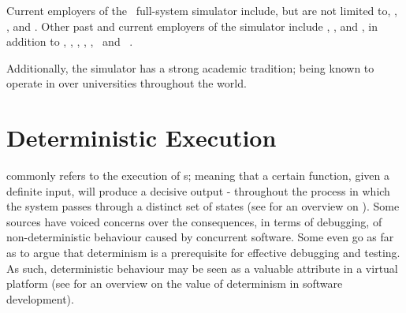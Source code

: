 Current employers of the \dvttermsimics\ full-system simulator include, but are not limited to, \dvttermibm {}, \dvttermnasa {}, and \dvttermintel {}.
Other past and current employers of the simulator include \dvttermsunmicrosystems , \dvttermericsson , and \dvttermhewlettpackard {}, in addition to \dvttermcisco , \dvttermfreescalesemiconductor , \dvttermgeavionics , \dvttermhoneywell , \dvttermlockheedmartin , \dvttermnortel\ and \dvttermnorthropgrumman\ .

Additionally, the simulator has a strong academic tradition; being known to operate in over  universities throughout the world.


\section*{Deterministic Execution}
\label{sec:background_deterministicexecution}

 commonly refers to the execution of \dvttermdeterministicalgorithm s; meaning that a certain function, given a definite input, will produce a decisive output - throughout the process in which the system passes through a distinct set of states (see  for an overview on ).
Some sources have voiced concerns over the consequences, in terms of debugging, of non-deterministic behaviour caused by concurrent software.
Some even go as far as to argue that determinism is a prerequisite for effective debugging and testing.
As such, deterministic behaviour may be seen as a valuable attribute in a virtual platform (see  for an overview on the value of determinism in software development).

